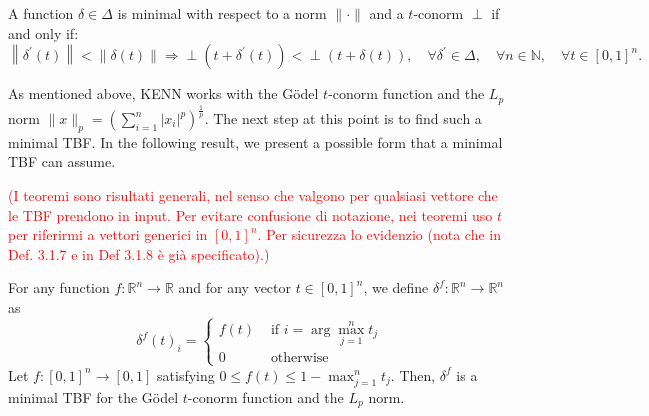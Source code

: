 \begin{definition}
	A function $\delta \in \Delta$ is minimal with respect to a norm $\|\cdot\|$ and a $t$-conorm $\perp$ if and only if:
	$$
	\left\|\delta^{\prime}(t)\right\|<\|\delta(t)\| \Rightarrow \perp\left(t+\delta^{\prime}(t)\right)<\perp(t+\delta(t)), \quad \forall \delta^{\prime} \in \Delta, \quad \forall n \in \mathbb{N}, \quad \forall t \in[0,1]^{n}.
	$$
\end{definition}

As mentioned above, KENN works with the Gödel $t$-conorm function and the $L_p$ norm $\|x\|_p = \left( \sum_{i=1}^n |x_i|^p \right)^{\frac{1}{p}}$.
The next step at this point is to find such a minimal TBF. In the following result, we present a possible form that a minimal TBF can assume.

\textcolor{red}{(I teoremi sono risultati generali, nel senso che valgono per qualsiasi vettore che le TBF prendono in input. Per evitare confusione di notazione, nei teoremi uso $t$ per riferirmi a vettori generici in $[0,1]^n$. Per sicurezza lo evidenzio (nota che in Def. 3.1.7 e in Def 3.1.8 è già specificato).)}
\begin{theorem}
	\label{thm:min_tbf}
	For any function $f: \mathbb{R}^{n} \rightarrow \mathbb{R}$ \textcolor{unipd}{and for any vector $t \in \left[0,1\right]^n$}, we define \mbox{$\delta^{f}: \mathbb{R}^{n} \rightarrow \mathbb{R}^{n}$} as
	$$
	\delta^{f}(t)_{i}= \begin{cases}f(t) & \text { if } i=\arg\max_{j=1}^n t_{j} \\ 0 & \text { otherwise }\end{cases}
	$$
	Let $f: \left[0,1\right]^{n} \rightarrow \left[0,1\right]$ satisfying $0 \leq f(t) \leq 1- \max_{j=1}^n t_j$. Then, $\delta^f$ is a minimal TBF for the Gödel $t$-conorm function and the $L_p$ norm.
\end{theorem}
